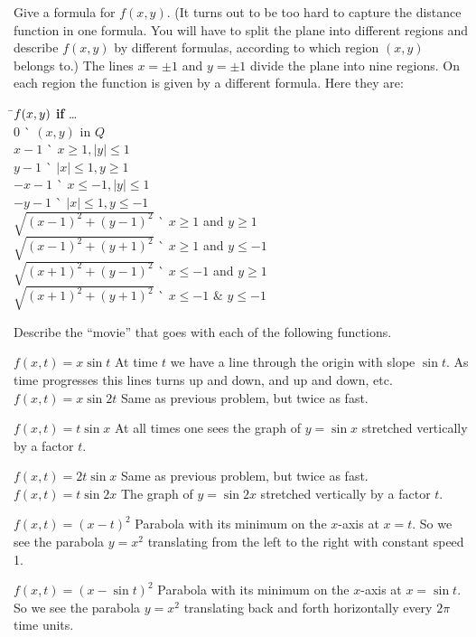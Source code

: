 \begin{multicols}{2}
\subprob Give a formula for $f(x, y)$.  (It turns out to be too hard to
capture the distance function in one formula.  You will have to split the
plane into different regions and describe $f(x,y)$ by different formulas,
according to which region $(x,y)$ belongs to.)
\answer
The lines $x=\pm1$ and $y=\pm1$ divide the plane into nine regions.
On each region the function is given by a different formula.
Here they are:
\begin{tabbing}
\=$\boldmath{f(x, y)}$ \=\`\textbf{ if } \ldots \\
\>$0$  \>\` $(x, y)$ in $Q$\\
\>$x-1$ \>\` $x\geq1, |y|\leq 1$\\
\>$y-1$ \>\` $|x|\leq 1, y\geq1$\\
\>$-x-1$ \>\` $x\le-1, |y|\leq 1$\\
\>$-y-1$ \>\` $|x|\leq 1, y\le-1$\\
\>$\sqrt{(x-1)^2+(y-1)^2}$ \>\` $x\ge1$ and $y\ge1$\\
\>$\sqrt{(x-1)^2+(y+1)^2}$ \>\` $x\ge1$ and $y\le-1$\\
\>$\sqrt{(x+1)^2+(y-1)^2}$ \>\` $x\le-1$ and $y\ge1$\\
\>$\sqrt{(x+1)^2+(y+1)^2}$ \>\` $x\le-1$ \& $y\le-1$\\
\end{tabbing}
\endanswer

\problem  Describe the ``movie'' that goes with each of the following 
functions.

\subprob $f(x, t) = x\sin t$
\answer
At time $t$ we have a line through the origin with slope $\sin t$.
As time progresses this lines turns up and down, and up and down,  etc.
\endanswer
\subprob $f(x, t) = x\sin 2t$
\answer
Same as previous problem, but twice as fast.
\endanswer

\subprob $f(x, t) = t\sin x$
\answer
At all times one sees the graph of $y=\sin x$ stretched vertically by a factor $t$.
\endanswer

\subprob $f(x, t) = 2t \sin x$
\answer
Same as previous problem, but twice as fast.
\endanswer
\subprob $f(x, t) = t\sin 2x$
\answer
The graph of $y=\sin 2x$ stretched vertically by a factor $t$.
\endanswer

\subprob $f(x, t) = (x-t)^2$
\answer
Parabola with its minimum on the $x$-axis at $x=t$.
So we see the parabola $y=x^2$ translating from the left to the right
with constant speed 1.
\endanswer

\subprob $f(x, t) = (x-\sin t)^2$
\answer
Parabola with its minimum on the $x$-axis at $x=\sin t$.
So we see the parabola $y=x^2$ translating back and forth horizontally
every $2\pi$ time units.
\endanswer


\end{multicols}

